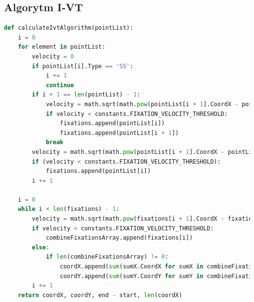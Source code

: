 \subsection{Algorytm I-VT}
\label{ssec:implementivt}
\begin{lstlisting}[language=Python, caption=Kod algorytmu I-VT, label={lst:ivt}]
def calculateIvtAlgorithm(pointList):
    i = 0
    for element in pointList:
        velocity = 0
        if pointList[i].Type == 'SS':
            i += 1
            continue
        if i + 1 == len(pointList) - 1:
            velocity = math.sqrt(math.pow(pointList[i + 1].CoordX - pointList[i].CoordX, 2) + math.pow(pointList[i + 1].CoordY - pointList[i].CoordY, 2))
            if velocity < constants.FIXATION_VELOCITY_THRESHOLD:
                fixations.append(pointList[i])
                fixations.append(pointList[i + 1])
            break
        velocity = math.sqrt(math.pow(pointList[i + 1].CoordX - pointList[i].CoordX, 2) + math.pow(pointList[i + 1].CoordY - pointList[i].CoordY, 2))
        if (velocity < constants.FIXATION_VELOCITY_THRESHOLD):
            fixations.append(pointList[i])
        i += 1
    
    i = 0
    while i < len(fixations) - 1:
        velocity = math.sqrt(math.pow(fixations[i + 1].CoordX - fixations[i].CoordX, 2) + math.pow(fixations[i + 1].CoordY - fixations[i].CoordY, 2))
        if velocity < constants.FIXATION_VELOCITY_THRESHOLD:
            combineFixationsArray.append(fixations[i])
        else:
            if len(combineFixationsArray) != 0:
                coordX.append(sum(sumX.CoordX for sumX in combineFixationsArray) / len(combineFixationsArray))
                coordY.append(sum(sumY.CoordY for sumY in combineFixationsArray) / len(combineFixationsArray))
        i += 1
    return coordX, coordY, end - start, len(coordX)
\end{lstlisting}
